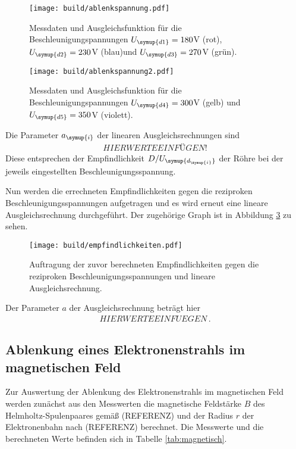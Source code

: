 \begin{figure}[h]
  \centering
  \texttt{[image: build/ablenkspannung.pdf]}
  \caption{Messdaten und Ausgleichsfunktion für die Beschleunigungspannungen
  $U_{\symup{d1}}=180$V (rot), $U_{\symup{d2}}=230$V (blau)und $U_{\symup{d3}}=270$V (grün).}
  \label{fig:ablenkspannung}
\end{figure}

\begin{figure}[h]
  \centering
  \texttt{[image: build/ablenkspannung2.pdf]}
  \caption{Messdaten und Ausgleichsfunktion für die Beschleunigungspannungen
  $U_{\symup{d4}}=300$V (gelb) und $U_{\symup{d5}}=350$V (violett).}
  \label{fig:ablenkspannung2}
\end{figure}

Die Parameter $a_{\symup{i}}$ der linearen Ausgleichsrechnungen sind
\begin{align*}
  HIER WERTE EINFÜGEN!
\end{align*}
Diese entsprechen der Empfindlichkeit $D/U_{\symup{d_{\symup{i}}}}$ der Röhre bei
der jeweils eingestellten Beschleunigungsspannung.

Nun werden die errechneten Empfindlichkeiten gegen die reziproken Beschleunigungsspannungen
aufgetragen und es wird erneut eine lineare Ausgleichsrechnung durchgeführt. Der
zugehörige Graph ist in Abbildung \ref{fig:empfindlichkeiten} zu sehen.

\begin{figure}[h]
  \centering
  \texttt{[image: build/empfindlichkeiten.pdf]}
  \caption{Auftragung der zuvor berechneten Empfindlichkeiten gegen die reziproken
  Beschleunigungsspannungen und lineare Ausgleichsrechnung.}
  \label{fig:empfindlichkeiten}
\end{figure}

Der Parameter $a$ der Ausgleichsrechnung beträgt hier
\begin{align*}
  HIER WERTE EINFUEGEN \,.
\end{align*}




\subsection{Ablenkung eines Elektronenstrahls im magnetischen Feld}
\label{subsec:bfeld}

Zur Auswertung der Ablenkung des Elektronenstrahls im magnetischen Feld werden
zunächst aus den Messwerten die magnetische Feldstärke $B$ des Helmholtz-Spulenpaares
gemäß (REFERENZ) und der Radius $r$ der Elektronenbahn nach (REFERENZ) berechnet. Die Messwerte und
die berechneten Werte befinden sich in Tabelle \ref{tab:magnetisch}.

